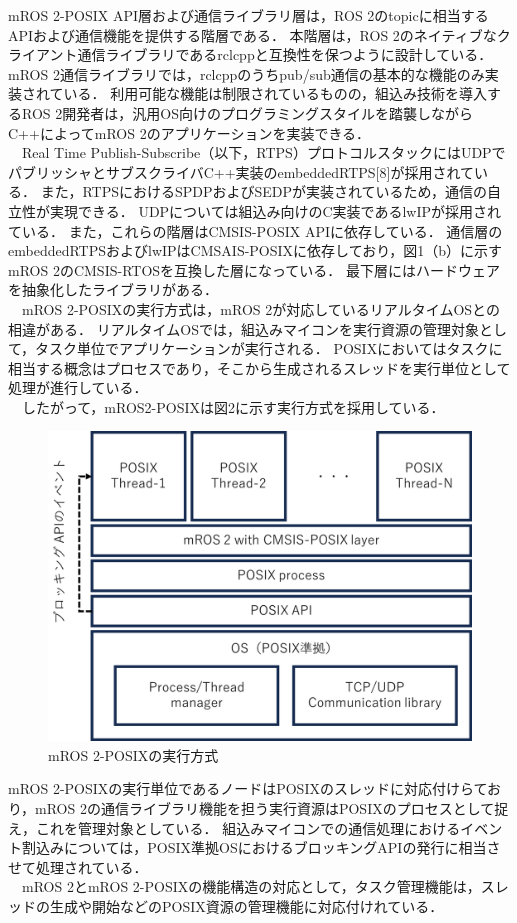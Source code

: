 \documentclass[11pt]{ujarticle}
\begin{document}
mROS 2-POSIX API層および通信ライブラリ層は，ROS 2のtopicに相当するAPIおよび通信機能を提供する階層である．
本階層は，ROS 2のネイティブなクライアント通信ライブラリであるrclcppと互換性を保つように設計している．
mROS 2通信ライブラリでは，rclcppのうちpub/sub通信の基本的な機能のみ実装されている．
利用可能な機能は制限されているものの，組込み技術を導入するROS 2開発者は，汎用OS向けのプログラミングスタイルを踏襲しながらC++によってmROS 2のアプリケーションを実装できる．
\\　Real Time Publish-Subscribe（以下，RTPS）プロトコルスタックにはUDPでパブリッシャとサブスクライバC++実装のembeddedRTPS[8]が採用されている．
また，RTPSにおけるSPDPおよびSEDPが実装されているため，通信の自立性が実現できる．
UDPについては組込み向けのC実装であるlwIPが採用されている．
また，これらの階層はCMSIS-POSIX APIに依存している．
通信層のembeddedRTPSおよびlwIPはCMSAIS-POSIXに依存しており，図1（b）に示すmROS 2のCMSIS-RTOSを互換した層になっている．
最下層にはハードウェアを抽象化したライブラリがある．
\\　mROS 2-POSIXの実行方式は，mROS 2が対応しているリアルタイムOSとの相違がある．
リアルタイムOSでは，組込みマイコンを実行資源の管理対象として，タスク単位でアプリケーションが実行される．
POSIXにおいてはタスクに相当する概念はプロセスであり，そこから生成されるスレッドを実行単位として処理が進行している．
\\　したがって，mROS2-POSIXは図2に示す実行方式を採用している．
\begin{figure}[t]
	\includegraphics[width=0.6\linewidth]{./src/fig2_execution_structure.png}
	\caption{mROS 2-POSIXの実行方式}
  \label{fig:arch}
\end{figure}
mROS 2-POSIXの実行単位であるノードはPOSIXのスレッドに対応付けらており，mROS 2の通信ライブラリ機能を担う実行資源はPOSIXのプロセスとして捉え，これを管理対象としている．
組込みマイコンでの通信処理におけるイベント割込みについては，POSIX準拠OSにおけるブロッキングAPIの発行に相当させて処理されている．
\\　mROS 2とmROS 2-POSIXの機能構造の対応として，タスク管理機能は，スレッドの生成や開始などのPOSIX資源の管理機能に対応付けれている．
\end{document}
